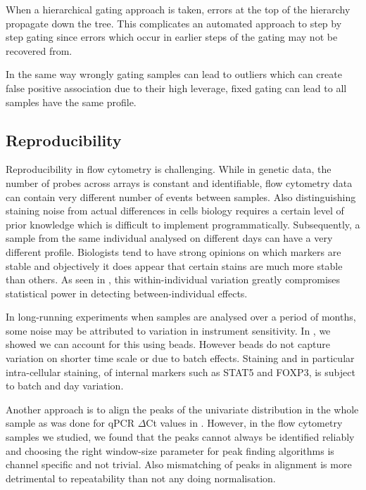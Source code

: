 When a hierarchical gating approach is taken, errors at the top of the hierarchy propagate down the tree.
This complicates an automated approach to step by step gating since errors which occur in earlier steps of the gating may not be recovered from.

In the same way wrongly gating samples can lead to outliers which can create false positive association due to their high leverage,
fixed gating can lead to all samples have the same profile.

\subsection{Reproducibility}

Reproducibility in flow cytometry is challenging.
While in genetic data, the number of probes across arrays is constant and identifiable,
flow cytometry data can contain very different number of events between samples.
Also distinguishing staining noise from actual differences in cells biology requires a certain level of prior knowledge which is difficult to implement programmatically.
Subsequently, a sample from the same individual analysed on different days can have a very different profile.
Biologists tend to have strong opinions on which markers are stable and objectively it does appear that certain stains are much more stable than others.
As seen in , this within-individual variation greatly compromises statistical power in detecting between-individual effects.

In long-running experiments when samples are analysed over a period of months, some noise may be attributed to variation in instrument sensitivity.
In , we showed we can account for this using beads.
However beads do not capture variation on shorter time scale or due to batch effects.
Staining and in particular intra-cellular staining, of internal markers such as STAT5 and FOXP3, is subject to batch and day variation.

Another approach is to align the peaks of the univariate distribution in the whole sample as was done for qPCR $\Delta$Ct values in .
However, in the flow cytometry samples we studied, we found that the peaks cannot always be identified reliably and choosing the right window-size parameter for peak finding algorithms is channel specific and not trivial.
Also mismatching of peaks in alignment is more detrimental to repeatability than not any doing normalisation.

